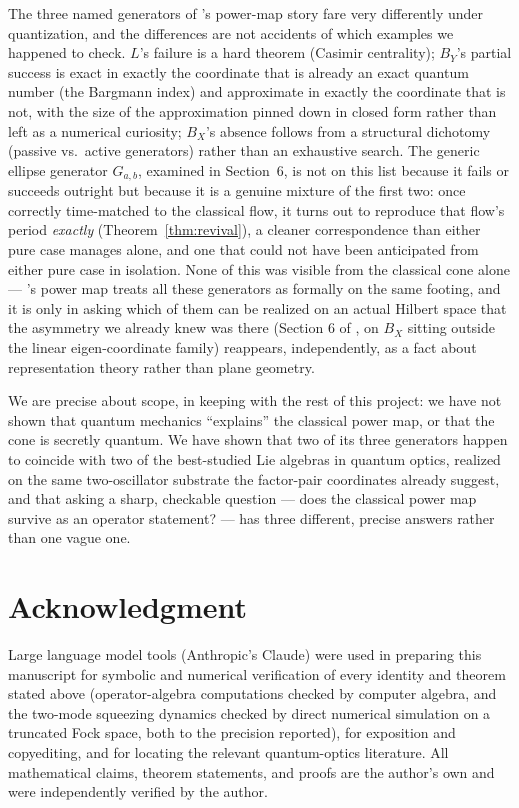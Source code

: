 \documentclass[11pt]{amsart}
\theoremstyle{remark}
\begin{document}
The three named generators of \cite{Ebert2026EigenCoord}'s power-map story fare very differently under quantization, and the differences are not accidents of which examples we happened to check. $L$'s failure is a hard theorem (Casimir centrality); $B_Y$'s partial success is exact in exactly the coordinate that is already an exact quantum number (the Bargmann index) and approximate in exactly the coordinate that is not, with the size of the approximation pinned down in closed form rather than left as a numerical curiosity; $B_X$'s absence follows from a structural dichotomy (passive vs.\ active generators) rather than an exhaustive search. The generic ellipse generator $G_{a,b}$, examined in Section~6, is not on this list because it fails or succeeds outright but because it is a genuine mixture of the first two: once correctly time-matched to the classical flow, it turns out to reproduce that flow's period \emph{exactly} (Theorem~\ref{thm:revival}), a cleaner correspondence than either pure case manages alone, and one that could not have been anticipated from either pure case in isolation. None of this was visible from the classical cone alone --- \cite{Ebert2026EigenCoord}'s power map treats all these generators as formally on the same footing, and it is only in asking which of them can be realized on an actual Hilbert space that the asymmetry we already knew was there (Section 6 of \cite{Ebert2026EigenCoord}, on $B_X$ sitting outside the linear eigen-coordinate family) reappears, independently, as a fact about representation theory rather than plane geometry.

We are precise about scope, in keeping with the rest of this project: we have not shown that quantum mechanics ``explains'' the classical power map, or that the cone is secretly quantum. We have shown that two of its three generators happen to coincide with two of the best-studied Lie algebras in quantum optics, realized on the same two-oscillator substrate the factor-pair coordinates already suggest, and that asking a sharp, checkable question --- does the classical power map survive as an operator statement? --- has three different, precise answers rather than one vague one.

\section*{Acknowledgment}

Large language model tools (Anthropic's Claude) were used in preparing this manuscript for symbolic and numerical verification of every identity and theorem stated above (operator-algebra computations checked by computer algebra, and the two-mode squeezing dynamics checked by direct numerical simulation on a truncated Fock space, both to the precision reported), for exposition and copyediting, and for locating the relevant quantum-optics literature. All mathematical claims, theorem statements, and proofs are the author's own and were independently verified by the author.
\end{document}
